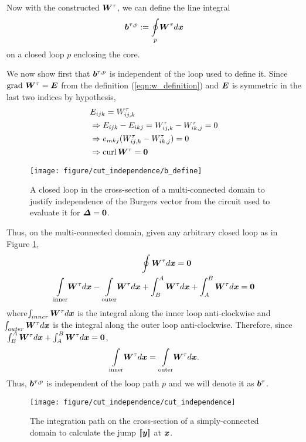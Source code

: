 \documentclass[11pt,letterpaper]{article}
\begin{document}
Now with the constructed $\bfW^\tau$, we can define the line integral 
\begin{equation*}
\bfb^{\tau,p}:= \underset{p}{\oint} \bfW^\tau d\bfx 
\end{equation*}
on a closed loop $p$ enclosing the core. 


We now show first that $\bfb^{\tau,p}$ is independent of the loop used to define it. Since $\grad \, \bfW^\tau = \bfE$ from the definition (\ref{eqn:w_definition}) and $\bfE$ is symmetric in the last two indices by hypothesis, 
\begin{equation*}
\begin{aligned}
&E_{ijk} = W^\tau_{ij,k} \\
&\Rightarrow E_{ijk}-E_{ikj} = W^\tau_{ij,k}-W^\tau_{ik,j} = 0 \\
&\Rightarrow e_{mkj}( W^\tau_{ij,k}-W^\tau_{ik,j}) = 0 \\
&\Rightarrow \curl \bfW^\tau = \bf0
\end{aligned}
\end{equation*}
\begin{figure}
\centering
\texttt{[image: figure/cut\_independence/b\_define]}
\caption{A closed loop in the cross-section of a multi-connected domain to justify independence of the Burgers vector from the circuit used to evaluate it for $\bfDelta = \bf0$.}
\label{fig:cut_proof_4}
\end{figure}
Thus, on the multi-connected domain, given any arbitrary closed loop as in Figure \ref{fig:cut_proof_4}, 
\begin{align*}
&\oint \bfW^\tau d\bfx = \bf0 \\
\underset{\text{inner}} {\int} \bfW^\tau d\bfx  -   \underset{\text{outer}}{\int} \bfW^\tau d\bfx &+ \int_B^A \bfW^\tau d\bfx + \int_A^B \bfW^\tau d\bfx  = \bf0
\end{align*}
where $ \!\!\int_{inner} \bfW^\tau d\bfx$ is the integral along the inner loop anti-clockwise and $\!\! \int_{outer} \bfW^\tau d\bfx$ is the integral along the outer loop anti-clockwise. Therefore, since $\int_B^A \bfW^\tau d\bfx + \int_A^B \bfW^\tau d\bfx = \bf0$,
\begin{equation*}
\underset{\text{inner}} {\int} \bfW^\tau d\bfx  = \underset{\text{outer}} {\int} \bfW^\tau d\bfx.
\end{equation*}
Thus, $\bfb^{\tau,p}$ is independent of the loop path $p$ and we will denote it as $\bfb^{\tau}$.

\begin{figure}
\centering
\texttt{[image: figure/cut\_independence/cut\_independence]}
\caption{The integration path on the cross-section of a simply-connected domain to calculate the jump $\llbracket {\bfy} \rrbracket$ at $\bfx$.}
\label{fig:cut_proof_5}
\end{figure}
\end{document}
